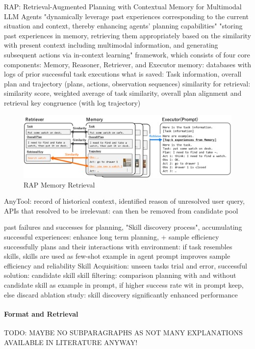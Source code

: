 \documentclass{article}
\begin{document}
\cite{kagaya_rap_2024} RAP: Retrieval-Augmented Planning with Contextual Memory for Multimodal LLM Agents
"dynamically leverage past experiences corresponding to the current situation and context, thereby enhancing agents’ planning capabilities"
"storing past experiences in memory, retrieving them appropriately based on the similarity with present context including multimodal information, and generating subsequent actions via in-context learning"
framework, which consists of four core components: Memory, Reasoner, Retriever, and Executor
memory: databases with logs of prior successful task executions
what is saved: Task information, overall plan and trajectory (plans, actions, observation sequences)
similarity for retrieval: similarity score, weighted average of task similarity, overall plan alignment and retrieval key congruence (with log trajectory)
\begin{figure}[h]
	\centering
	\includegraphics[width=0.9\linewidth]{RAPMemoryRetrieval.png}
	\caption{RAP Memory Retrieval \cite{kagaya_rap_2024}}
	\label{fig:rapmemoryretrieval}
\end{figure}

\cite{du_anytool_2024} AnyTool: record of historical context, identified reason of unresolved user query, APIs that resolved to be irrelevant: can then be removed from candidate pool

\cite{sun_adaplanner_2023-1} past failures and successes for planning, "Skill discovery process", accumulating successful experiences: enhance long term planning, + sample efficiency
successfully plans and their interactions with environment: if task resembles skills, skills are used as few-shot example in agent prompt
improves sample efficiency and reliability
Skill Acquisition: unseen tasks trial and error, successful solution: candidate skill
skill filtering: comparison planning with and without candidate skill as example in prompt, if higher success rate wit in prompt keep, else discard
ablation study: skill discovery significantly enhanced performance

\paragraph{Format and Retrieval}
TODO: MAYBE NO SUBPARAGRAPHS AS NOT MANY EXPLANATIONS AVAILABLE IN LITERATURE ANYWAY!
\end{document}
